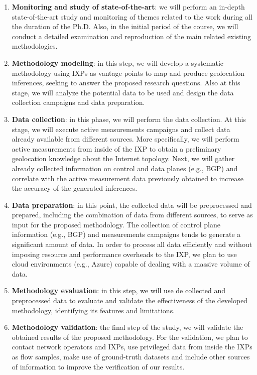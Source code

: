 \begin{enumerate}
\item {\bf Monitoring and study of state-of-the-art}: we will perform an in-depth state-of-the-art study and monitoring of themes related to the work during all the duration of the Ph.D. Also, in the initial period of the course, we will conduct a detailed examination and reproduction of the main related existing methodologies.

\item {\bf Methodology modeling}: in this step, we will develop a systematic methodology using IXPs as vantage points to map and produce geolocation inferences, seeking to answer the proposed research questions. Also at this stage, we will analyze the potential data to be used and design the data collection campaigns and data preparation.

\item {\bf Data collection}: in this phase, we will perform the data collection. At this stage, we will execute active measurements campaigns and collect data already available from different sources. More specifically, we will perform active measurements from inside of the IXP to obtain a preliminary geolocation knowledge about the Internet topology. Next, we will gather already collected information on control and data planes (e.g., BGP) and correlate with the active measurement data previously obtained to increase the accuracy of the generated inferences.

\item {\bf Data preparation}: in this point, the collected data will be preprocessed and prepared, including the combination of data from different sources, to serve as input for the proposed methodology. The collection of control plane information (e.g., BGP) and measurements campaigns tends to generate a significant amount of data. In order to process all data efficiently and without imposing resource and performance overheads to the IXP, we plan to use cloud environments (e.g., Azure) capable of dealing with a massive volume of data.

\item {\bf Methodology evaluation}: in this step, we will use de collected and preprocessed data to evaluate and validate the effectiveness of the developed methodology, identifying its features and limitations.

\item {\bf Methodology validation}: the final step of the study, we will validate the obtained results of the proposed methodology. For the validation, we plan to contact network operators and IXPs, use privileged data from inside the IXPs as flow samples, make use of ground-truth datasets and include other sources of information to improve the verification of our results. 


\end{enumerate}
